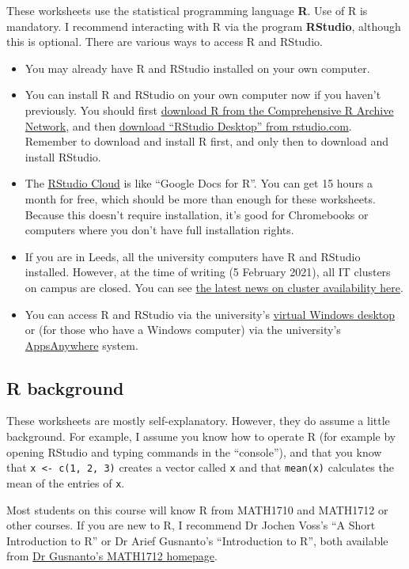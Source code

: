 \documentclass[
  a4paper,
]{article}
\providecommand{\tightlist}{%
  \setlength{\itemsep}{0pt}\setlength{\parskip}{0pt}}
\theoremstyle{definition}
\theoremstyle{definition}
\theoremstyle{definition}
\theoremstyle{remark}
\begin{document}
These worksheets use the statistical programming language \textbf{R}. Use of R is mandatory. I recommend interacting with R via the program \textbf{RStudio}, although this is optional. There are various ways to access R and RStudio.

\begin{itemize}
\tightlist
\item
  You may already have R and RStudio installed on your own computer.
\item
  You can install R and RStudio on your own computer now if you haven't previously. You should first \href{https://cran.rstudio.com/}{download R from the Comprehensive R Archive Network}, and then \href{https://rstudio.com/products/rstudio/download/\#download}{download ``RStudio Desktop'' from rstudio.com}. Remember to download and install R first, and only then to download and install RStudio.
\item
  The \href{https://rstudio.cloud/}{RStudio Cloud} is like ``Google Docs for R''. You can get 15 hours a month for free, which should be more than enough for these worksheets. Because this doesn't require installation, it's good for Chromebooks or computers where you don't have full installation rights.
\item
  If you are in Leeds, all the university computers have R and RStudio installed. However, at the time of writing (5 February 2021), all IT clusters on campus are closed. You can see \href{https://leeds.service-now.com/it?id=clusters}{the latest news on cluster availability here}.
\item
  You can access R and RStudio via the university's \href{https://it.leeds.ac.uk/it?id=kb_article\&sysparm_article=KB0014548}{virtual Windows desktop} or (for those who have a Windows computer) via the university's \href{https://it.leeds.ac.uk/it?id=kb_article\&sysparm_article=KB0014827}{AppsAnywhere} system.
\end{itemize}

\hypertarget{R-background}{%
\subsection*{R background}\label{R-background}}

These worksheets are mostly self-explanatory. However, they do assume a little background. For example, I assume you know how to operate R (for example by opening RStudio and typing commands in the ``console''), and that you know that \texttt{x\ \textless{}-\ c(1,\ 2,\ 3)} creates a vector called \texttt{x} and that \texttt{mean(x)} calculates the mean of the entries of \texttt{x}.

Most students on this course will know R from MATH1710 and MATH1712 or other courses. If you are new to R, I recommend Dr Jochen Voss's ``A Short Introduction to R'' or Dr Arief Gusnanto's ``Introduction to R'', both available from \href{http://www1.maths.leeds.ac.uk/~arief/MATH1712/index.html}{Dr Gusnanto's MATH1712 homepage}.
\end{document}
